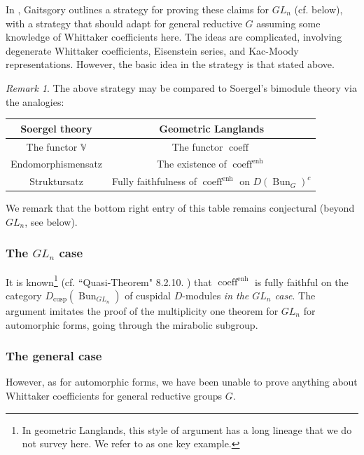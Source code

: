 \documentclass[reqno,11pt]{amsart}
\numberwithin{equation}{subsection}
\theoremstyle{remark}
\newtheorem{rem}[thm]{Remark}
\newcommand{\bV}{{\mathbb V}}
\newcommand{\on}{\operatorname}
\newcommand{\Bun}{\on{Bun}}
\newcommand{\coeff}{\on{coeff}}
\newcommand{\enh}{\on{enh}}
\newcommand{\cusp}{\on{cusp}}
\begin{document}
In \cite{dennis-laumonconf}, Gaitsgory outlines a strategy for proving
these claims for $GL_n$ (cf. below), with a strategy that should
adapt for general reductive $G$ assuming some knowledge of Whittaker
coefficients here. 
The ideas are complicated, involving degenerate Whittaker
coefficients, Eisenstein series, and Kac-Moody representations.
However, the basic idea in the strategy is that stated above.

\begin{rem}

The above strategy may be compared to Soergel's bimodule theory 
via the analogies:

\begin{center}
\begin{tabular}{ |c|c| } 
\hline
 Soergel theory & Geometric Langlands \\
 \hline 
The functor $\bV$ & The functor $\coeff$ \\
Endomorphismensatz & The existence of $\coeff^{\enh}$ \\
Struktursatz & Fully faithfulness of $\coeff^{\enh}$ on $D(\Bun_G)^c$ \\
 \hline
\end{tabular}
\end{center}

We remark that the bottom right entry of this table remains conjectural
(beyond $GL_n$, see below). 

\end{rem}

\subsubsection{The $GL_n$ case}

It is known\footnote{In geometric Langlands, this style of argument
has a long lineage that we do not survey here. We refer to \cite{fgv-gl} as
one key example.} 
(cf. \cite{dennis-laumonconf} ``Quasi-Theorem" 8.2.10.
\cite{dario-extended}) that $\coeff^{\enh}$ is fully faithful 
on the category $D_{\cusp}(\Bun_{GL_n})$ 
of cuspidal $D$-modules \emph{in the $GL_n$ case}.
The argument imitates the proof of the multiplicity one theorem for $GL_n$
for automorphic forms, going through the
mirabolic subgroup.

\subsubsection{The general case}

However, as for automorphic forms, we have been unable to prove
anything about Whittaker coefficients for general reductive groups $G$.
\end{document}
